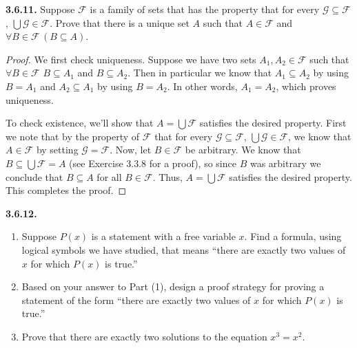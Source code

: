 \documentclass[12pt]{amsart}
\newenvironment{statement}[1]{\smallskip\noindent\color[rgb]{.6627, .3529, .6314} {\bf #1.}}{}
\theoremstyle{definition}
\theoremstyle{remark}
\begin{document}
\begin{statement}{3.6.11}
Suppose $\mathcal{F}$ is a family of sets that has the property that for every $\mathcal{G} \subseteq \mathcal{F}$, $\bigcup \mathcal{G} \in \mathcal{F}$.
Prove that there is a unique set $A$ such that $A \in \mathcal{F}$ and $\forall B \in \mathcal{F} \, (B \subseteq A)$.
\end{statement}

\begin{proof}
We first check uniqueness.
Suppose we have two sets $A_1, A_2 \in \mathcal{F}$ such that $\forall B \in \mathcal{F}$ $B \subseteq A_1$ and $B \subseteq A_2$.
Then in particular we know that $A_1 \subseteq A_2$ by using $B = A_1$ and $A_2 \subseteq A_1$ by using $B = A_2$.
In other words, $A_1 = A_2$, which proves uniqueness.

To check existence, we'll show that $A = \bigcup \mathcal{F}$ satisfies the desired property.
First we note that by the property of $\mathcal{F}$ that for every $\mathcal{G} \subseteq \mathcal{F}$, $\bigcup \mathcal{G} \in \mathcal{F}$, we know that $A \in \mathcal{F}$ by setting $\mathcal{G} = \mathcal{F}$.
Now, let $B \in \mathcal{F}$ be arbitrary.
We know that $B \subseteq \bigcup \mathcal{F} = A$ (see Exercise 3.3.8 for a proof), so since $B$ was arbitrary we conclude that $B \subseteq A$ for all $B \in \mathcal{F}$.
Thus, $A = \bigcup \mathcal{F}$ satisfies the desired property.
This completes the proof.
\end{proof}


\begin{statement}{3.6.12}
\begin{enumerate}
	\item Suppose $P(x)$ is a statement with a free variable $x$.
	Find a formula, using logical symbols we have studied, that means
	``there are exactly two values of $x$ for which $P(x)$ is true.''
	
	\item Based on your answer to Part (1), design a proof strategy for proving a statement of the form
	``there are exactly two values of $x$ for which $P(x)$ is true.''
	
	\item Prove that there are exactly two solutions to the equation $x^3 = x^2$.
\end{enumerate}
\end{statement}
\end{document}
